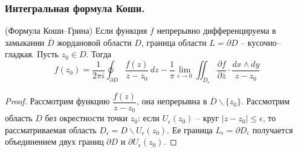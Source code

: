 \subsubsection{Интегральная формула Коши.}
\begin{theorem*}(Формула Коши--Грина)
	Если функция $f$ непрерывно дифференцируема в замыкании $\overline{D}$ жордановой области $D$, граница области $L = \partial D$ -- кусочно--гладкая. Пусть $z_0 \in D$. Тогда $$	f(z_0) =\dfrac{1}{2\pi i} \oint_{\partial D} \dfrac{f(z)}{z - z_0}\, dz - \dfrac{1}{\pi} \lim\limits_{\epsilon \to 0} \iint_{D_{\epsilon}} \dfrac{\partial f}{\partial \overline{z}} \cdot \dfrac{dx \wedge dy}{z - z_0}$$
\end{theorem*}
\begin{proof}
	Рассмотрим функцию $\dfrac{f(z)}{z - z_0}$, она непрерывна в $\overline{D} \backslash \{z_0\}$. Рассмотрим область $D$ без окрестности точки $z_0$: если $U_{\epsilon}(z_0)$ -- круг $|z - z_0 |\leqslant \epsilon$, то рассматриваемая область $D_{\epsilon} = D \backslash U_{\epsilon}(z_0)$. Ее граница $L_{\epsilon} = \partial D_{\epsilon}$ получается объединением двух границ $\partial D$ и  $\partial U_{\epsilon}(z_0)$.
	

\end{proof}
